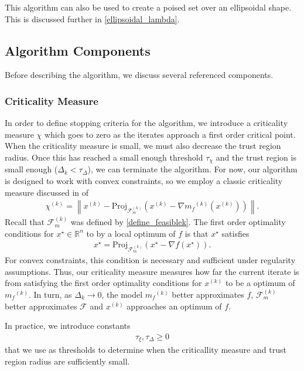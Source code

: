 \documentclass{article}
\theoremstyle{case}
\numberwithin{theorem}{subsection}
\newcommand{\chik}{{\chi^{(k)}}}
\newcommand{\dk}{\Delta_k}
\newcommand{\feasiblek}{{\mathcal F_m^{(k)}}}
\newcommand{\feasible}{{\mathcal F}}
\newcommand{\gradf}{\nabla f}
\newcommand{\mfk}{{{m}_f}^{(k)}}
\newcommand{\Rn}{\mathbb R^n}
\newcommand{\tolcrit}{\tau_{\xi}}
\newcommand{\tolrad}{\tau_{\Delta}}
\newcommand{\xk}{x^{(k)}}
\begin{document}
This algorithm can also be used to create a poised set over an ellipsoidal shape.
This is discussed further in \cref{ellipsoidal_lambda}.



\subsection{Algorithm Components}

Before describing the algorithm, we discuss several referenced components.

\subsubsection{Criticality Measure}

In order to define stopping criteria for the algorithm, we introduce a criticality measure $\chi$ which goes to zero as the iterates approach a first order critical point.
When the criticality measure is small, we must also decrease the trust region radius.
Once this has reached a small enough threshold $\tau_{\chi}$ and the trust region is small enough ($\Delta_k < \tau_{\Delta}$), we can terminate the algorithm.
For now, our algorithm is designed to work with convex constraints, so we employ a classic criticality measure discussed in \cite{ConnGoulToin00} of
\begin{align}
\label{define_criticality_measure}
\chik = \left\|\xk - \text{Proj}_{\feasiblek}\left(\xk- \nabla \mfk\left(\xk\right)\right)\right\|.
\end{align}
Recall that $\feasiblek$ was defined by \cref{define_feasiblek}.
The first order optimality conditions for $x^{\star} \in \Rn$ to by a local optimum of $f$ is that $x^{\star}$ satisfies
\begin{align*}
x^{\star} = \text{Proj}_{\feasiblek}\left(x^{\star} - \gradf(x^{\star})\right).
\end{align*}
For convex constraints, this condition is necessary and sufficient under regularity assumptions.
Thus, our criticality measure measures how far the current iterate is from satisfying the first order optimality conditions for $\xk$ to be a optimum of $\mfk$.
In turn, as $\dk \to 0$, the model $\mfk$ better approximates $f$, $\feasiblek$ better approximates $\feasible$ and $\xk$ approaches an optimum of $f$.

In practice, we introduce constants 
\begin{align}
            \tolcrit, \tolrad \ge 0 \label{define_algorithm_tolerances}
\end{align}
that we use as thresholds to determine when the criticallity measure and trust region radius are sufficiently small.
\end{document}
